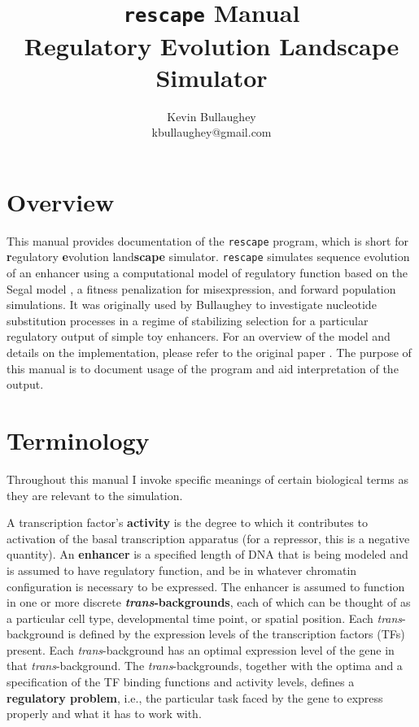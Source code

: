 \documentclass[11pt]{article}
\author{Kevin Bullaughey \\ \normalsize{kbullaughey@gmail.com}}
\title{\texttt{rescape} Manual\\ \normalsize{Regulatory Evolution Landscape Simulator}}
\begin{document}
\maketitle
\pagebreak
\tableofcontents
\pagebreak

\section{Overview}

This manual provides documentation of the \texttt{rescape} program, which is short for \textbf{r}egulatory \textbf{e}volution land\textbf{scape} simulator. \texttt{rescape} simulates sequence evolution of an enhancer using a computational model of regulatory function based on the Segal model \cite{Segal:2008p460}, a fitness penalization for misexpression, and forward population simulations. It was originally used by Bullaughey \cite{Bullaughey:2011p6261} to investigate nucleotide substitution processes in a regime of stabilizing selection for a particular regulatory output of simple toy enhancers. For an overview of the model and details on the implementation, please refer to the original paper \cite{Bullaughey:2011p6261}. The purpose of this manual is to document usage of the program and aid interpretation of the output.

\section{Terminology}

Throughout this manual I invoke specific meanings of certain biological terms as they are relevant to the simulation. 

A transcription factor's \textbf{activity} is the degree to which it contributes to activation of the basal transcription apparatus (for a repressor, this is a negative quantity). An \textbf{enhancer} is a specified length of DNA that is being modeled and is assumed to have regulatory function, and be in whatever chromatin configuration is necessary to be expressed. The enhancer is assumed to function in one or more discrete \textbf{\emph{trans}-backgrounds}, each of which can be thought of as a particular cell type, developmental time point, or spatial position. Each \emph{trans}-background is defined by the expression levels of the transcription factors (TFs) present. Each \emph{trans}-background has an optimal expression level of the gene in that \emph{trans}-background. The \emph{trans}-backgrounds, together with the optima and a specification of the TF binding functions and activity levels, defines a \textbf{regulatory problem}, i.e., the particular task faced by the gene to express properly and what it has to work with.
\end{document}
